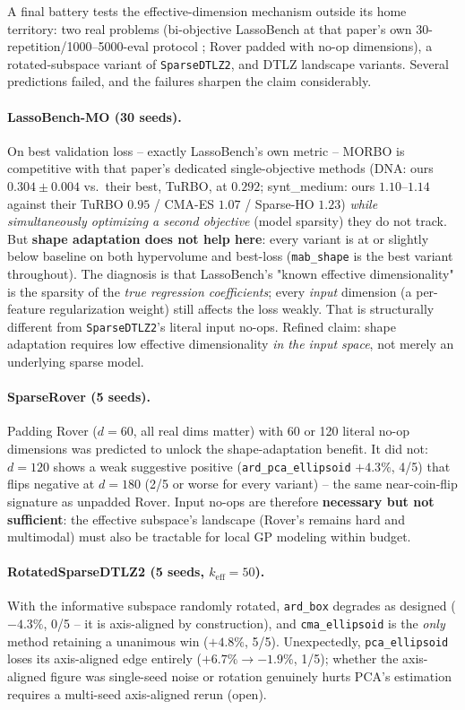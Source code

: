 \documentclass[11pt]{article}
\begin{document}
A final battery tests the effective-dimension mechanism outside its home
territory: two real problems (bi-objective LassoBench at that paper's own
30-repetition/1000--5000-eval protocol \citep{sehic2022lassobench}; Rover
padded with no-op dimensions), a rotated-subspace variant of
\texttt{SparseDTLZ2}, and DTLZ landscape variants. Several predictions
failed, and the failures sharpen the claim considerably.

\paragraph{LassoBench-MO (30 seeds).} On best validation loss -- exactly
LassoBench's own metric -- MORBO is competitive with that paper's
dedicated single-objective methods (DNA: ours $0.304 \pm 0.004$ vs.\ their
best, TuRBO, at $0.292$; synt\_medium: ours $1.10$--$1.14$ against their
TuRBO $0.95$ / CMA-ES $1.07$ / Sparse-HO $1.23$) \emph{while
simultaneously optimizing a second objective} (model sparsity) they do
not track. But \textbf{shape adaptation does not help here}: every
variant is at or slightly below baseline on both hypervolume and
best-loss (\texttt{mab\_shape} is the best variant throughout). The
diagnosis is that LassoBench's "known effective dimensionality" is the
sparsity of the \emph{true regression coefficients}; every \emph{input}
dimension (a per-feature regularization weight) still affects the loss
weakly. That is structurally different from \texttt{SparseDTLZ2}'s literal
input no-ops. Refined claim: shape adaptation requires low effective
dimensionality \emph{in the input space}, not merely an underlying sparse
model.

\paragraph{SparseRover (5 seeds).} Padding Rover ($d{=}60$, all real dims
matter) with 60 or 120 literal no-op dimensions was predicted to unlock
the shape-adaptation benefit. It did not: $d{=}120$ shows a weak
suggestive positive (\texttt{ard\_pca\_ellipsoid} $+4.3\%$, 4/5) that
flips negative at $d{=}180$ (2/5 or worse for every variant) -- the same
near-coin-flip signature as unpadded Rover. Input no-ops are therefore
\textbf{necessary but not sufficient}: the effective subspace's landscape
(Rover's remains hard and multimodal) must also be tractable for local GP
modeling within budget.

\paragraph{RotatedSparseDTLZ2 (5 seeds, $k_{\mathrm{eff}}{=}50$).} With
the informative subspace randomly rotated, \texttt{ard\_box} degrades as
designed ($-4.3\%$, 0/5 -- it is axis-aligned by construction), and
\texttt{cma\_ellipsoid} is the \emph{only} method retaining a unanimous
win ($+4.8\%$, 5/5). Unexpectedly, \texttt{pca\_ellipsoid} loses its
axis-aligned edge entirely ($+6.7\% \to -1.9\%$, 1/5); whether the
axis-aligned figure was single-seed noise or rotation genuinely hurts
PCA's estimation requires a multi-seed axis-aligned rerun (open).
\end{document}
